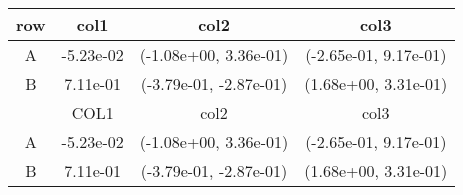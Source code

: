 \begin{tabular}{cccc}
\toprule
row&col1&col2&col3\tabularnewline
\midrule
A&-5.23e-02& (-1.08e+00, 3.36e-01)& (-2.65e-01, 9.17e-01)\tabularnewline
B&7.11e-01& (-3.79e-01, -2.87e-01)& (1.68e+00, 3.31e-01)\tabularnewline
\midrule
&COL1&col2&col3\tabularnewline
\midrule
A&-5.23e-02& (-1.08e+00, 3.36e-01)& (-2.65e-01, 9.17e-01)\tabularnewline
B&7.11e-01& (-3.79e-01, -2.87e-01)& (1.68e+00, 3.31e-01)\tabularnewline
\bottomrule
\end{tabular}
